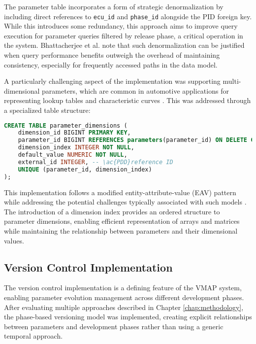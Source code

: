 The parameter table incorporates a form of strategic denormalization by including direct references to \texttt{ecu\_id} and \texttt{phase\_id} alongside the \ac{PID} foreign key. While this introduces some redundancy, this approach aims to improve query execution for parameter queries filtered by release phase, a critical operation in the system. Bhattacherjee et al. \cite{bhattacherjee2015principles} note that such denormalization can be justified when query performance benefits outweigh the overhead of maintaining consistency, especially for frequently accessed paths in the data model.

A particularly challenging aspect of the implementation was supporting multi-dimensional parameters, which are common in automotive applications for representing lookup tables and characteristic curves \cite{kiencke2000automotive}. This was addressed through a specialized table structure:

\begin{lstlisting}[language=SQL, caption={Parameter Dimension Implementation}, label={lst:parameter-dimension}]
CREATE TABLE parameter_dimensions (
    dimension_id BIGINT PRIMARY KEY,
    parameter_id BIGINT REFERENCES parameters(parameter_id) ON DELETE CASCADE,
    dimension_index INTEGER NOT NULL,
    default_value NUMERIC NOT NULL,
    external_id INTEGER, -- \ac{PDD}reference ID
    UNIQUE (parameter_id, dimension_index)
);
\end{lstlisting}

This implementation follows a modified entity-attribute-value (EAV) pattern while addressing the potential challenges typically associated with such models \cite{dinu2007guidelines}. The introduction of a dimension index provides an ordered structure to parameter dimensions, enabling efficient representation of arrays and matrices while maintaining the relationship between parameters and their dimensional values.

\subsection{Version Control Implementation}
\label{subsec:version-control-implementation}

The version control implementation is a defining feature of the \ac{VMAP} system, enabling parameter evolution management across different development phases. After evaluating multiple approaches described in Chapter \ref{chap:methodology}, the phase-based versioning model was implemented, creating explicit relationships between parameters and development phases rather than using a generic temporal approach.

